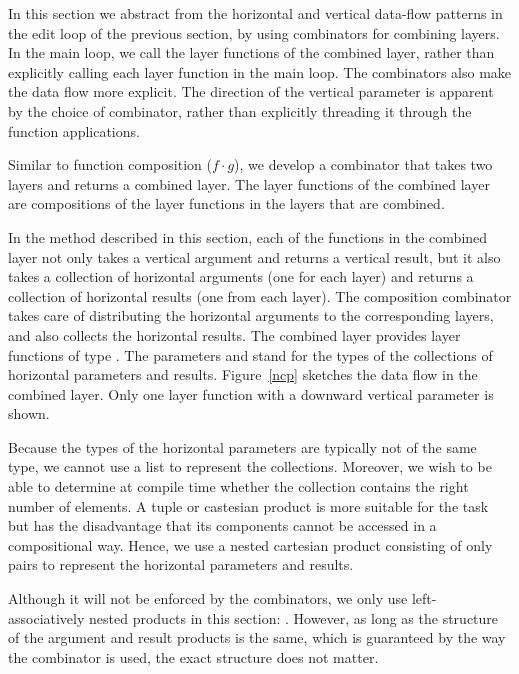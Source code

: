 \documentclass[preprint,natbib]{sigplanconf}
\begin{document}
In this section we abstract from the horizontal and vertical data-flow patterns in the edit loop of the previous section, by using combinators for combining layers. In the main loop, we call the layer functions of the combined layer, rather than explicitly calling each layer function in the main loop. The combinators also make the data flow more explicit. The direction of the vertical parameter is apparent by the choice of combinator, rather than explicitly threading it through the function applications.

Similar to function composition ($f \cdot g$), we develop a  combinator that takes two layers and returns a combined layer. The layer functions of the combined layer are compositions of the layer functions in the layers that are combined.

In the method described in this section, each of the functions in the combined layer not only takes a vertical argument and returns a vertical result, but it also takes a collection of horizontal arguments (one for each layer) and returns a collection of horizontal results (one from each layer). The composition combinator takes care of distributing the horizontal arguments to the corresponding layers, and also collects the horizontal results. The combined layer provides layer functions of type . The parameters  and  stand for the types of the collections of horizontal parameters and results. Figure~\ref{ncp} sketches the data flow in the combined layer. Only one layer function with a downward vertical parameter is shown.

Because the types of the horizontal parameters are typically not of the same type, we cannot use a list to represent the collections. Moreover, we wish to be able to determine at compile time whether the collection contains the right number of elements. A tuple or castesian product is more suitable for the task but has the disadvantage that its components cannot be accessed in a compositional way. Hence, we use a nested cartesian product consisting of only pairs to represent the horizontal parameters and results. 

Although it will not be enforced by the combinators, we only use left-associatively nested products in this section: 
. However, as long as the structure of the argument and result products is the same, which is guaranteed by the way the  combinator is used, the exact structure does not matter.
\end{document}
